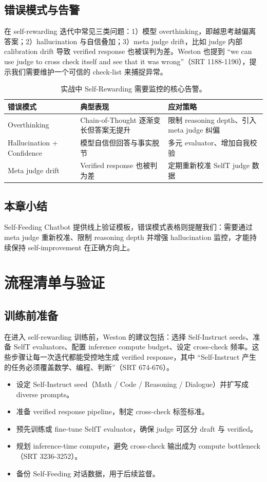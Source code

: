 \documentclass[a4paper]{article}
\begin{document}
\subsection{错误模式与告警}
在 self-rewarding 迭代中常见三类问题：1）模型 overthinking，即越思考越偏离答案；2）hallucination 与自信叠加；3）meta judge drift，比如 judge 内部 calibration drift 导致 verified response 也被误判为差。Weston 也提到 ``we can use judge to cross check itself and see that it was wrong''（SRT 1188-1190），提示我们需要维护一个可信的 check-list 来捕捉异常。

\begin{table}[H]
\centering
\begin{tabular}{p{4cm}p{5cm}p{5cm}}
\toprule
错误模式 & 典型表现 & 应对策略 \\
\midrule
Overthinking & Chain-of-Thought 逐渐变长但答案无提升 & 限制 reasoning depth、引入 meta judge 纠偏 \\
Hallucination + Confidence & 模型自信但回答与事实脱节 & 多元 evaluator、增加自我校验 \\
Meta judge drift & Verified response 也被判为差 & 定期重新校准 SelfT judge 数据 \\
\bottomrule
\end{tabular}
\caption{实战中 Self-Rewarding 需要监控的核心告警。}
\end{table}

\subsection{本章小结}
Self-Feeding Chatbot 提供线上验证模板，错误模式表格则提醒我们：需要通过 meta judge 重新校准、限制 reasoning depth 并增强 hallucination 监控，才能持续保持 self-improvement 在正确方向上。

\section{流程清单与验证}
\subsection{训练前准备}
在进入 self-rewarding 训练前，Weston 的建议包括：选择 Self-Instruct seeds、准备 SelfT evaluators、配置 inference compute budget、设定 cross-check 频率。这些步骤让每一次迭代都能受控地生成 verified response，其中 ``Self-Instruct 产生的任务必须覆盖数学、编程、判断''（SRT 674-676）。

\begin{itemize}
    \item 设定 Self-Instruct seed（Math / Code / Reasoning / Dialogue）并扩写成 diverse prompts。
    \item 准备 verified response pipeline，制定 cross-check 标签标准。
    \item 预先训练或 fine-tune SelfT evaluator，确保 judge 可区分 draft 与 verified。
    \item 规划 inference-time compute，避免 cross-check 输出成为 compute bottleneck（SRT 3236-3252）。
    \item 备份 Self-Feeding 对话数据，用于后续监督。
\end{itemize}
\end{document}
